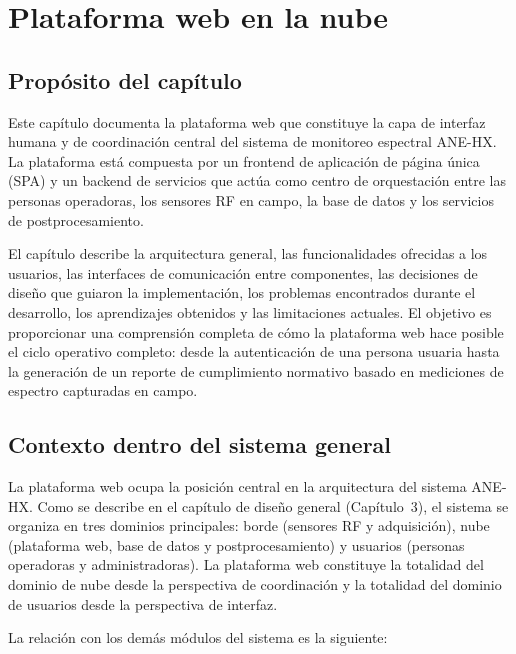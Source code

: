 \chapter{Plataforma web en la nube}

\section{Propósito del capítulo}

Este capítulo documenta la plataforma web que constituye la capa de interfaz
humana y de coordinación central del sistema de monitoreo espectral ANE-HX. La
plataforma está compuesta por un frontend de aplicación de página única (SPA)
y un backend de servicios que actúa como centro de orquestación entre las
personas operadoras, los sensores RF en campo, la base de datos y los
servicios de postprocesamiento.

El capítulo describe la arquitectura general, las funcionalidades ofrecidas a
los usuarios, las interfaces de comunicación entre componentes, las decisiones
de diseño que guiaron la implementación, los problemas encontrados durante el
desarrollo, los aprendizajes obtenidos y las limitaciones actuales. El
objetivo es proporcionar una comprensión completa de cómo la plataforma web
hace posible el ciclo operativo completo: desde la autenticación de una
persona usuaria hasta la generación de un reporte de cumplimiento normativo
basado en mediciones de espectro capturadas en campo.

\section{Contexto dentro del sistema general}

La plataforma web ocupa la posición central en la arquitectura del sistema
ANE-HX. Como se describe en el capítulo de diseño general (Capítulo~3), el
sistema se organiza en tres dominios principales: borde (sensores RF y
adquisición), nube (plataforma web, base de datos y postprocesamiento) y
usuarios (personas operadoras y administradoras). La plataforma web constituye
la totalidad del dominio de nube desde la perspectiva de coordinación y la
totalidad del dominio de usuarios desde la perspectiva de interfaz.

La relación con los demás módulos del sistema es la siguiente:

